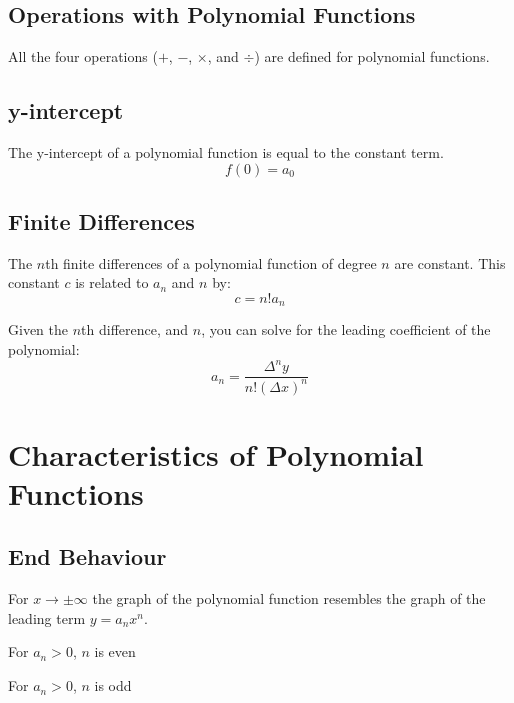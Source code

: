 		\subsection{Operations with Polynomial Functions}
			All the four operations ($+$, $-$, $\times$, and $\div$) are defined for polynomial functions.
		\subsection{y-intercept}
			The y-intercept of a polynomial function is equal to the constant term.
			\[f(0) = a_0\]
		\subsection{Finite Differences}
			The $n$th finite differences of a polynomial function of degree $n$ are constant. This constant $c$ is related to $a_n$ and $n$ by:
			\[c=n!a_n\]

			Given the $n$th difference, and $n$, you can solve for the leading coefficient of the polynomial:
			\[a_n = \frac{\Delta^n y}{n!(\Delta x)^n}\]
	\section{Characteristics of Polynomial Functions}
		\subsection{End Behaviour}
			For $x \to \pm\infty$ the graph of the polynomial function resembles the graph of the leading term $y=a_nx^n$.
			\vspace{\baselineskip}

			\begin{minipage}{0.5\textwidth}
				\centering
				For $a_n > 0$, $n$ is even
				\vspace{\baselineskip}

			\end{minipage}
			\begin{minipage}{0.5\textwidth}
				\centering
				For $a_n > 0$, $n$ is odd
				\vspace{\baselineskip}

			\end{minipage}
			\vspace{\baselineskip}

